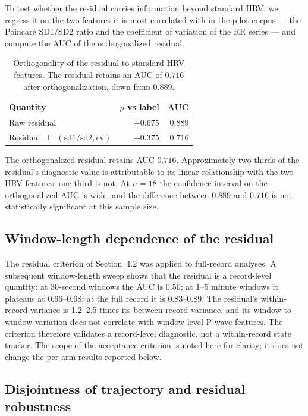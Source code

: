\documentclass[11pt]{article}
\begin{document}
To test whether the residual carries information beyond standard HRV,
we regress it on the two features it is most correlated with in the
pilot corpus --- the Poincar\'e SD1/SD2 ratio and the coefficient of
variation of the RR series --- and compute the AUC of the
orthogonalized residual.

\begin{table}[h]
\centering
\begin{tabular}{lrr}
\toprule
Quantity & $\rho$ vs label & AUC \\
\midrule
Raw residual & $+0.675$ & $0.889$ \\
Residual $\perp$ $(\mathrm{sd1/sd2}, \mathrm{cv})$ & $+0.375$ & $0.716$ \\
\bottomrule
\end{tabular}
\caption{Orthogonality of the residual to standard HRV features. The
residual retains an AUC of $0.716$ after orthogonalization, down from
$0.889$.}
\label{tab:orthogonality}
\end{table}

The orthogonalized residual retains AUC $0.716$. Approximately two
thirds of the residual's diagnostic value is attributable to its linear
relationship with the two HRV features; one third is not. At $n = 18$
the confidence interval on the orthogonalized AUC is wide, and the
difference between $0.889$ and $0.716$ is not statistically significant
at this sample size.

\subsection{Window-length dependence of the residual}

The residual criterion of Section~4.2 was applied to full-record
analyses. A subsequent window-length sweep shows that the residual is a
record-level quantity: at 30-second windows the AUC is 0.50; at 1--5
minute windows it plateaus at 0.66--0.68; at the full record it is
0.83--0.89. The residual's within-record variance is 1.2--2.5 times
its between-record variance, and its window-to-window variation does
not correlate with window-level P-wave features. The criterion
therefore validates a record-level diagnostic, not a within-record
state tracker. The scope of the acceptance criterion is noted here for
clarity; it does not change the per-arm results reported below.

\subsection{Disjointness of trajectory and residual robustness}
\end{document}
